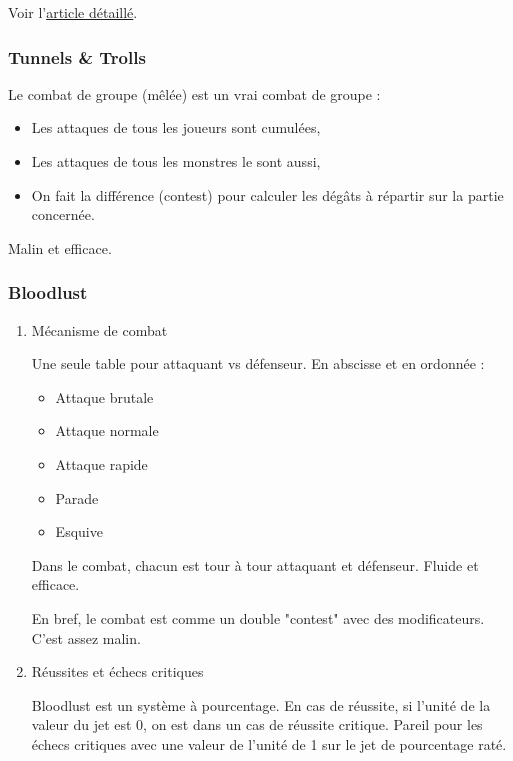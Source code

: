 \documentclass[a4paper, 11pt, twoside]{article}
\begin{document}
Voir l'\href{https://github.com/orey/jdr/tree/master/Fudge-fr}{article détaillé}.

\subsubsection{Tunnels \& Trolls}
\label{sec:org805bb55}

Le combat de groupe (mêlée) est un vrai combat de groupe :
\begin{itemize}
\item Les attaques de tous les joueurs sont cumulées,
\item Les attaques de tous les monstres le sont aussi,
\item On fait la différence (contest) pour calculer les dégâts à répartir sur la partie concernée.
\end{itemize}

Malin et efficace.

\subsubsection{Bloodlust}
\label{sec:orgd3983d3}

\begin{enumerate}
\item Mécanisme de combat
\label{sec:org051ee09}

Une seule table pour attaquant vs défenseur. En abscisse et en ordonnée :
\begin{itemize}
\item Attaque brutale
\item Attaque normale
\item Attaque rapide
\item Parade
\item Esquive
\end{itemize}

Dans le combat, chacun est tour à tour attaquant et défenseur. Fluide et efficace.

En bref, le combat est comme un double "contest" avec des modificateurs. C'est assez malin.

\item Réussites et échecs critiques
\label{sec:org5fcbdf8}

Bloodlust est un système à pourcentage. En cas de réussite, si l'unité de la valeur du jet est 0, on est dans un cas de réussite critique. Pareil pour les échecs critiques avec une valeur de l'unité de 1 sur le jet de pourcentage raté.
\end{enumerate}
\end{document}
